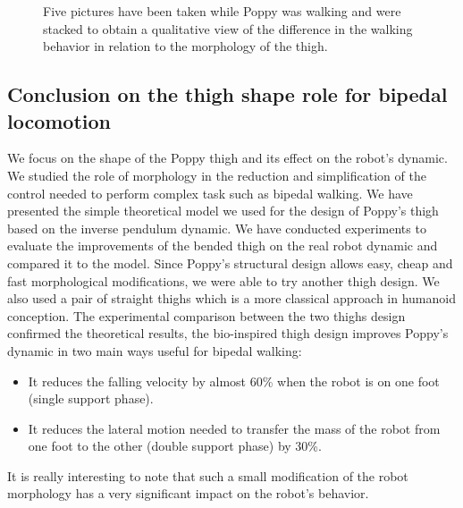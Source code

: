 \begin{figure}[h]
\centering
    \hfil
    \caption{Five pictures have been taken while Poppy was walking and were stacked to obtain a qualitative view of the difference in the walking behavior in relation to the morphology of the thigh.}
    \label{fig:poppy_walking_compared}
\end{figure}


\subsection{Conclusion on the thigh shape role for bipedal locomotion} %
We focus on the shape of the Poppy thigh and its effect on the robot’s dynamic. We studied the role of morphology in the reduction and simplification of the control needed to perform complex task such as bipedal walking. We have presented the simple theoretical model we used for the design of Poppy’s thigh based on the inverse pendulum dynamic. We have conducted experiments to evaluate the improvements of the bended thigh on the real robot dynamic and compared it to the model. Since Poppy’s structural design allows easy, cheap and fast morphological modifications, we were able to try another thigh design. We also used a pair of straight thighs which is a more classical approach in humanoid conception. The experimental comparison between the two thighs design confirmed the theoretical results, the bio-inspired thigh design improves Poppy’s dynamic in two main ways useful for bipedal walking:
\begin{itemize}
    \item It reduces the falling velocity by almost 60\% when the robot is on one foot (single support phase).
    \item It reduces the lateral motion needed to transfer the mass of the robot from one foot to the other (double support phase) by 30\%.
\end{itemize}
It is really interesting to note that such a small modification of the robot morphology has a very significant impact on the robot’s behavior.


